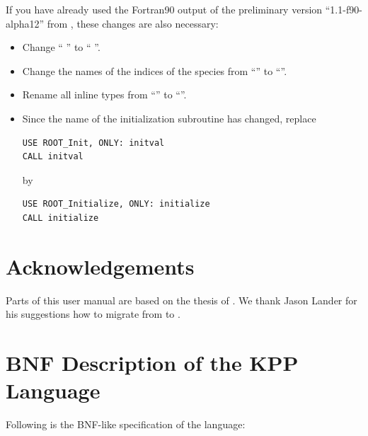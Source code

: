 \documentclass[twoside]{article}
\begin{document}
If you have already used the Fortran90 output of the preliminary version
``1.1-f90-alpha12'' from \citet{1666}, these changes are also necessary:

\begin{itemize}
\item Change `` '' to ``
  ''.
\item Change the names of the indices of the species from
  ``'' to ``''.
\item Rename all inline types from ``'' to ``''.
\item Since the name of the initialization subroutine has changed,
  replace
\begin{verbatim}
USE ROOT_Init, ONLY: initval
CALL initval
\end{verbatim}
  by
\begin{verbatim}
USE ROOT_Initialize, ONLY: initialize
CALL initialize
\end{verbatim}
\end{itemize}

\section{Acknowledgements}

Parts of this user manual are based on the thesis of \citet{1693}. We
thank Jason Lander for his suggestions how to migrate from 
to .





\onecolumn\appendix

\section{BNF Description of the KPP Language}
\label{sec:bnf}

Following is the BNF-like specification of the language:
\end{document}
